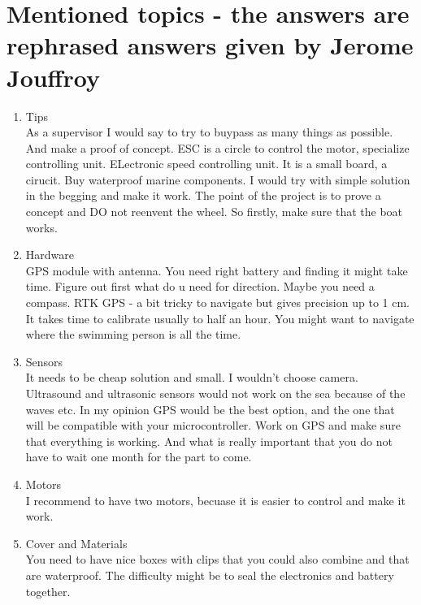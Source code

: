 \documentclass{article}[10pt]
\begin{document}
\section{Mentioned topics - the answers are rephrased answers given by Jerome Jouffroy}
\begin{enumerate}
    \item Tips\\
    As a supervisor I would say to try to buypass as many things as possible. And make a proof of concept. ESC is a circle to control the motor, specialize controlling unit. ELectronic speed controlling unit.
It is a small board, a cirucit. Buy waterproof marine components. I would try with simple solution in the begging and make it work. The point of the project is to prove a concept and DO not reenvent the wheel. So firstly, make sure that the boat works.
    \item Hardware\\
GPS module with antenna.  You need right battery and finding it might take time. Figure out first what do u need 
for direction. Maybe you need a compass. RTK GPS - a bit tricky to navigate but gives precision up to 1 cm. It takes time to calibrate 
usually to half an hour. You might want to navigate where the swimming person is all the time. 
    \item Sensors\\
It needs to be cheap solution and small. I wouldn't choose camera. Ultrasound and ultrasonic sensors would not work on the sea because of the waves etc. 
In my opinion GPS would be the best option, and the one that will be compatible with your microcontroller. Work on GPS and make sure that everything is working. 
And what is really important that you do not have to wait one month for the part to come. 
    \item Motors\\
I recommend to have two motors, becuase it is easier to control and make it work. 
    \item Cover and Materials\\
You need to have nice boxes with clips that you could also combine and that are waterproof. The difficulty might be to seal the electronics and battery together.

\end{enumerate}
\end{document}
